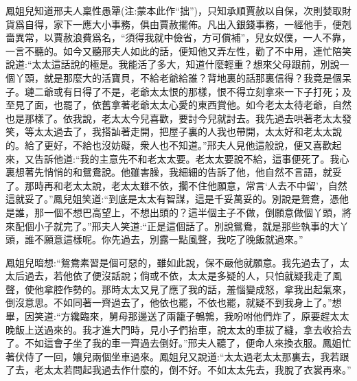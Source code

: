 \begin{parag}
    鳳姐兒知道邢夫人稟性愚犟(注:蒙本此作“拙”)，只知承順賈赦以自保，次則婪取財貨爲自得，家下一應大小事務，俱由賈赦擺佈。凡出入銀錢事務，一經他手，便剋嗇異常，以賈赦浪費爲名，“須得我就中儉省，方可償補”，兒女奴僕，一人不靠，一言不聽的。如今又聽邢夫人如此的話，便知他又弄左性，勸了不中用，連忙陪笑說道:“太太這話說的極是。我能活了多大，知道什麼輕重？想來父母跟前，別說一個丫頭，就是那麼大的活寶貝，不給老爺給誰？背地裏的話那裏信得？我竟是個呆子。璉二爺或有日得了不是，老爺太太恨的那樣，恨不得立刻拿來一下子打死；及至見了面，也罷了，依舊拿著老爺太太心愛的東西賞他。如今老太太待老爺，自然也是那樣了。依我說，老太太今兒喜歡，要討今兒就討去。我先過去哄著老太太發笑，等太太過去了，我搭訕著走開，把屋子裏的人我也帶開，太太好和老太太說的。給了更好，不給也沒妨礙，衆人也不知道。”邢夫人見他這般說，便又喜歡起來，又告訴他道:“我的主意先不和老太太要。老太太要說不給，這事便死了。我心裏想著先悄悄的和鴛鴦說。他雖害臊，我細細的告訴了他，他自然不言語，就妥了。那時再和老太太說，老太太雖不依，擱不住他願意，常言‘人去不中留’，自然這就妥了。”鳳兒姐笑道:“到底是太太有智謀，這是千妥萬妥的。別說是鴛鴦，憑他是誰，那一個不想巴高望上，不想出頭的？這半個主子不做，倒願意做個丫頭，將來配個小子就完了。”邢夫人笑道:“正是這個話了。別說鴛鴦，就是那些執事的大丫頭，誰不願意這樣呢。你先過去，別露一點風聲，我吃了晚飯就過來。”
\end{parag}


\begin{parag}
    鳳姐兒暗想:“鴛鴦素習是個可惡的，雖如此說，保不嚴他就願意。我先過去了，太太后過去，若他依了便沒話說；倘或不依，太太是多疑的人，只怕就疑我走了風聲，使他拿腔作勢的。那時太太又見了應了我的話，羞惱變成怒，拿我出起氣來，倒沒意思。不如同著一齊過去了，他依也罷，不依也罷，就疑不到我身上了。”想畢，因笑道:“方纔臨來，舅母那邊送了兩籠子鵪鶉，我吩咐他們炸了，原要趕太太晚飯上送過來的。我才進大門時，見小子們抬車，說太太的車拔了縫，拿去收拾去了。不如這會子坐了我的車一齊過去倒好。”邢夫人聽了，便命人來換衣服。鳳姐忙著伏侍了一回，孃兒兩個坐車過來。鳳姐兒又說道:“太太過老太太那裏去，我若跟了去，老太太若問起我過去作什麼的，倒不好。不如太太先去，我脫了衣裳再來。”
\end{parag}


